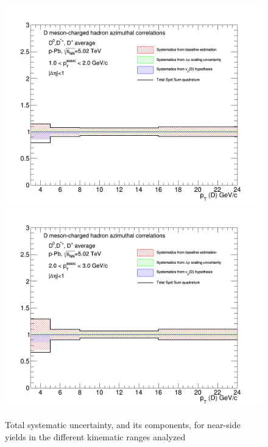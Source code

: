 \begin{figure}[!htbp]
{\includegraphics[width=0.49\linewidth, height=0.33\linewidth]{figures/FitOutput/TotalSystematicSourcesNSYield_pthad1dotto2dot.png}}
{\includegraphics[width=0.49\linewidth, height=0.33\linewidth]{figures/FitOutput/TotalSystematicSourcesNSYield_pthad2dotto3dot.png}}
\caption{Total systematic uncertainty, and its components, for near-side yields in the different kinematic ranges analyzed}
\label{fig:NSyieldTotalUnc}
\end{figure}

